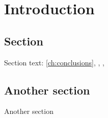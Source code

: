 \setchapterpreamble[u]{\margintoc}
\chapter{Introduction}

\section{Section} 

Section text: \ref{ch:conclusions}, , , 


\section{Another section} 

Another section




